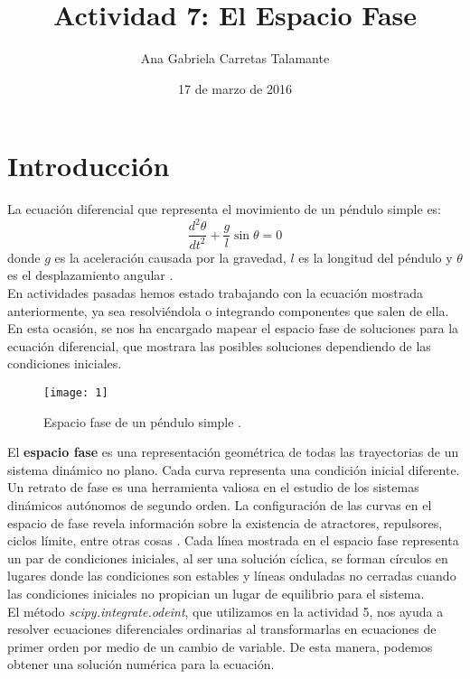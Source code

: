 \documentclass[12pt]{article}
\title{Actividad 7: El Espacio Fase}
\author{Ana Gabriela Carretas Talamante}
\date{17 de marzo de 2016}
\begin{document}
\maketitle
\section{Introducción}

La ecuación diferencial que representa el movimiento de un péndulo simple es:
\begin{equation}
\label{1}
\frac{d^2\theta}{dt^2} + \frac{g}{l}\sin\theta=0
\end{equation}
donde $g$ es la aceleración causada por la gravedad, $l$ es la longitud del péndulo y $\theta$ es el desplazamiento angular \cite{W}. \\

En actividades pasadas hemos estado trabajando con la ecuación mostrada anteriormente, ya sea resolviéndola o integrando componentes que salen de ella. En esta ocasión, se nos ha encargado mapear el espacio fase de soluciones para la ecuación diferencial, que mostrara las posibles soluciones dependiendo de las condiciones iniciales. \\

\begin{figure}[H]
\centering
   \texttt{[image: 1]}
  \caption{Espacio fase de un péndulo simple \cite{P}.}
\end{figure}

El \textbf{espacio fase} es una representación geométrica de todas las trayectorias de un sistema dinámico no plano. Cada curva representa una condición inicial diferente. Un retrato de fase es una herramienta valiosa en el estudio de los sistemas dinámicos autónomos de segundo orden. La configuración de las curvas en el espacio de fase revela información sobre la existencia de atractores, repulsores, ciclos límite, entre otras cosas \cite{EF}. Cada línea mostrada en el espacio fase representa un par de condiciones iniciales, al ser una solución cíclica, se forman círculos en lugares donde las condiciones son estables y líneas onduladas no cerradas cuando las condiciones iniciales no propician un lugar de equilibrio para el sistema. \\

El método \textit{scipy.integrate.odeint}, que utilizamos en la actividad 5, nos ayuda a resolver ecuaciones diferenciales ordinarias al transformarlas en ecuaciones de primer orden por medio de un cambio de variable. De esta manera, podemos obtener una solución numérica para la ecuación. 
\end{document}
